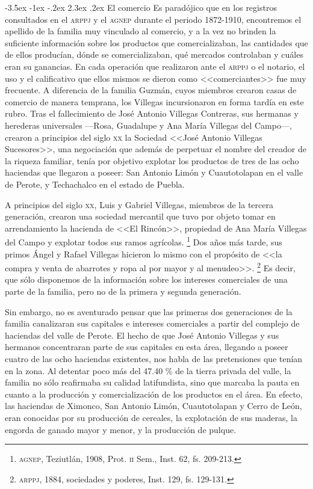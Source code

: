 \documentclass[14pt,twoside,final]{extbook} %
\makeatletter
\let\oldfootnote\footnote
\renewcommand\footnote[1]{%
\oldfootnote{\hspace{1mm}#1}}
\renewcommand\section{\@startsection {section}{1}{\z@}%
                                     {-3.5ex \@plus -1ex \@minus -.2ex}%
                                     {2.3ex \@plus .2ex}%
                                     {\normalfont\large\bfseries\sc}}
\makeatother
\begin{document}
\section{El comercio}\label{sec:el-comercio}
Es paradójico que en los registros consultados en el \textsc{arppj} y el \textsc{agnep} durante el
periodo 1872-1910, encontremos el apellido de la familia muy vinculado al comercio, y a la vez no brinden la suficiente información sobre los productos que comercializaban, las cantidades que de ellos producían, dónde se comercializaban, qué mercados controlaban y cuáles eran su ganancias. En cada operación que realizaron ante el \textsc{arppj} o el notario, el uso y el calificativo que ellos mismos se dieron como <<comerciantes>> fue muy frecuente. A diferencia de la familia Guzmán, cuyos miembros crearon casas de comercio de manera temprana, los Villegas incursionaron en forma tardía en este rubro. Tras el fallecimiento de José Antonio Villegas Contreras, sus hermanas y herederas universales ---Rosa, Guadalupe y Ana María Villegas del Campo---, crearon a principios del siglo \textsc{xx} la Sociedad <<José Antonio Villegas Sucesores>>, una negociación que además de perpetuar el nombre del creador de la riqueza familiar, tenía por objetivo explotar los productos de tres de las ocho haciendas que llegaron a poseer: San Antonio Limón y Cuautotolapan en el valle de Perote, y Techachalco en el estado de Puebla.

A principios del siglo \textsc{xx}, Luis y Gabriel Villegas, miembros de la tercera generación, crearon una sociedad mercantil que tuvo por objeto tomar en arrendamiento la hacienda de <<El Rincón>>, propiedad de Ana María Villegas del Campo y explotar todos sus ramos agrícolas.\footnote{\textsc{agnep}, Teziutlán, 1908, Prot. \textsc{ii} Sem., Inst. 62, fs. 209-213.} Dos años más tarde, sus primos Ángel y Rafael Villegas hicieron lo mismo con el propósito de <<la compra y venta de abarrotes y ropa al por mayor y al menudeo>>.\footnote{\textsc{arppj}, 1884, sociedades y poderes, Inst. 129, fs. 129-131.} Es decir, que sólo disponemos de la información sobre los intereses comerciales de una parte de la familia, pero no de la primera y segunda generación.

Sin embargo, no es aventurado pensar que las primeras dos generaciones de la familia canalizaran sus capitales e intereses comerciales a partir del complejo de haciendas del valle de Perote. El hecho de que José Antonio Villegas y sus hermanos concentraran parte de sus capitales en esta área, llegando a poseer cuatro de las ocho haciendas existentes, nos habla de las pretensiones que tenían en la zona. Al detentar poco más del 47.40 \% de la tierra privada del valle, la familia no sólo reafirmaba su
calidad latifundista, sino que marcaba la pauta en cuanto a la producción y comercialización de los productos en el área. En efecto, las haciendas de Ximonco, San Antonio Limón, Cuautotolapan y Cerro de León, eran conocidas por su producción de cereales, la explotación de sus maderas, la engorda de ganado mayor y menor, y la producción de pulque.
\end{document}
